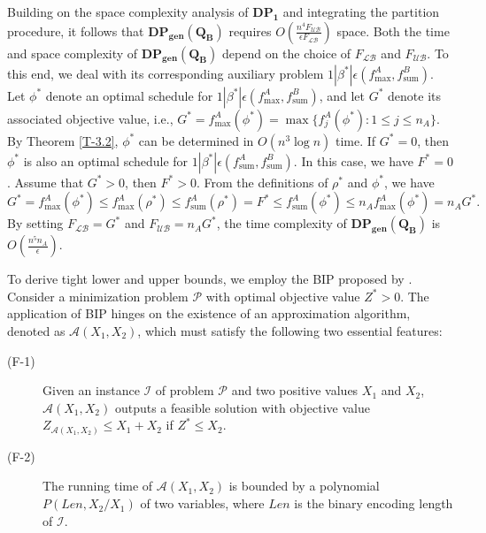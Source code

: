 \documentclass[12pt]{article}
\begin{document}
\begin{sloppypar}
Building on the space complexity analysis of $\mathbf{DP_1}$ and integrating the partition procedure, it follows that $\mathbf{DP_{gen}(Q_B)}$ requires $O(\frac{n^4 F_{\mathcal{UB}}}{\epsilon F_{\mathcal{LB}}})$ space. Both the time and space complexity of $\mathbf{DP_{gen}(Q_B)}$ depend on the choice of $F_{\mathcal{LB}}$ and $F_{\mathcal{UB}}$. To this end, we deal with its corresponding auxiliary problem $1 | \beta^{*}|\epsilon(f_{\mathrm{max}}^A, f_{\mathrm{sum}}^B)$. Let $\phi^{*}$ denote an optimal schedule for $1 | \beta^{*}|\epsilon(f_{\mathrm{max}}^A, f_{\mathrm{sum}}^B)$, and let $G^{*}$ denote its associated objective value, i.e., $G^{*}=f_{\mathrm{max}}^A(\phi^{*})=\max\{f_j^A(\phi^{*}): 1 \leq j \leq n_A\}$. By Theorem \ref{T-3.2}, $\phi^{*}$ can be determined in $O(n^3 \log n)$ time.
If  $G^{*}=0$, then $\phi^{*}$ is also an optimal schedule for $1 | \beta^{*}|\epsilon(f_{\mathrm{sum}}^A, f_{\mathrm{sum}}^B)$. In this case, we have $F^{*}=0$. Assume that $G^{*}>0$, then $F^{*}>0$. From the definitions of $\rho^{*}$ and $\phi^{*}$, we have
\begin{equation}\label{E-6.1}
G^{*}=f_{\mathrm{max}}^A(\phi^{*}) \leq f_{\mathrm{max}}^A(\rho^{*}) \leq f_{\mathrm{sum}}^A(\rho^{*})
= F^{*}\leq f_{\mathrm{sum}}^A(\phi^{*}) \leq n_A f_{\mathrm{max}}^A(\phi^{*})= n_A G^{*}.
\end{equation}
By setting $F_{\mathcal{LB}}=G^{*}$ and $F_{\mathcal{UB}}=n_A G^{*}$, the time complexity of $\mathbf{DP_{gen}(Q_B)}$ is $O(\frac{n^5 n_A}{\epsilon})$.

To derive tight lower and upper bounds, we employ the BIP proposed by \cite{ChubanovKP2006MP}. Consider a minimization problem $\mathcal{P}$ with optimal objective value $Z^{*}>0$. The application of BIP hinges on the existence of an approximation algorithm, denoted as $\mathcal{A}(X_1, X_2)$, which must satisfy the following two essential features: 

\begin{description}
\item [(F-1)] Given an instance $\mathcal{I}$ of problem $\mathcal{P}$ and two positive values $X_1$ and $X_2$, $\mathcal{A}(X_1, X_2)$ outputs a feasible solution with objective value $Z_{\mathcal{A}(X_1, X_2)} \leq X_1 + X_2$ if $Z^{*} \leq X_2$.

\item [(F-2)] The running time of $\mathcal{A}(X_1, X_2)$ is bounded by a polynomial $P(Len, X_2/X_1)$ of two variables, where $Len$ is the binary encoding length of $\mathcal{I}$.
\end{description}


\end{sloppypar}
\end{document}
